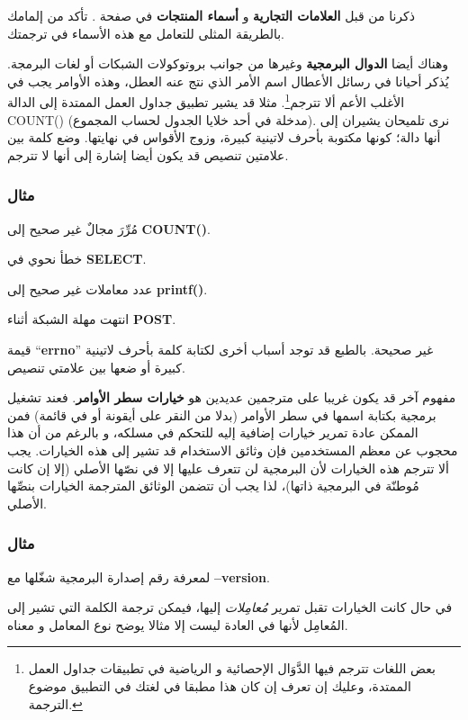 ذكرنا من قبل {\bf العلامات التجارية} و {\bf أسماء المنتجات} في صفحة
\at[ref:37296725]. تأكد من إلمامك بالطريقة المثلى للتعامل مع
هذه الأسماء في ترجمتك.

وهناك أيضا {\bf الدوال البرمجية} وغيرها من جوانب بروتوكولات الشبكات أو
لغات البرمجة. يُذكر أحيانا في رسائل الأعطال اسم الأمر الذي نتج عنه
العطل، وهذه الأوامر يجب في الأغلب الأعم ألا تترجم\footnote{بعض اللغات
تترجم فيها الدَّوَال الإحصائية و الرياضية في تطبيقات جداول العمل
الممتدة، وعليك إن تعرف إن كان هذا مطبقا في لغتك في التطبيق موضوع
الترجمة.}. مثلا قد يشير تطبيق جداول العمل الممتدة إلى الدالة ‪COUNT()‬
(مدخلة في أحد خلايا الجدول لحساب المجموع). نرى تلميحان يشيران إلى أنها
دالة؛ كونها مكتوبة بأحرف لاتينية كبيرة، وزوج الأقواس في نهايتها. وضع
كلمة بين علامتين تنصيص قد يكون أيضا إشارة إلى أنها لا تترجم.

\subsubsection{مثال}
\startitemize[1]
\item مُرِّرَ مجالٌ غير صحيح إلى {\bf COUNT()}.
\item خطأ نحوي في {\bf SELECT}.
\item عدد معاملات غير صحيح إلى {\bf printf()}.
\item انتهت مهلة الشبكة أثناء {\bf POST}.
\item قيمة “{\bf errno}” غير صحيحة.
\stopitemize
بالطبع قد توجد أسباب أخرى لكتابة كلمة بأحرف لاتينية كبيرة أو ضعها بين
علامتي تنصيص.

مفهوم آخر قد يكون غريبا على مترجمين عديدين هو {\bf خيارات سطر الأوامر}.
فعند تشغيل برمجية بكتابة اسمها في سطر الأوامر (بدلا من النقر على أيقونة
أو في قائمة) فمن الممكن عادة تمرير خيارات إضافية إليه للتحكم في مسلكه،
و بالرغم من أن هذا محجوب عن معظم المستخدمين فإن وثائق الاستخدام قد تشير
إلى هذه الخيارات. يجب ألا تترجم هذه الخيارات لأن البرمجية لن تتعرف
عليها إلا في نصّها الأصلي (إلا إن كانت مُوطنّة في البرمجية ذاتها)، لذا
يجب أن تتضمن الوثائق المترجمة الخيارات بنصِّها الأصلي.

\subsubsection{مثال}
لمعرفة رقم إصدارة البرمجية شغّلها مع {\bf --version}.

في حال كانت الخيارات تقبل تمرير {\it مُعامِلات} إليها، فيمكن ترجمة
الكلمة التي تشير إلى المُعامِل لأنها في العادة ليست إلا مثالا يوضح نوع
المعامل و معناه.

